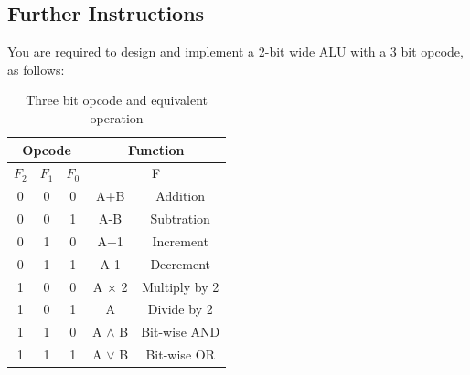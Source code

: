 \subsection{Further Instructions}
You are required to design and implement a 2-bit wide ALU with a 3 bit opcode, as follows:
\begin{table}[H]
\centering
\caption{Three bit opcode and equivalent operation}
\label{tbl:Opcodes}
\begin{tabular}{|c|c|c|c|c|}
\hline
\multicolumn{3}{|c|}{\textbf{Opcode}} & \multicolumn{2}{c|}{\textbf{Function}} \\ \hline
$F_2$ & $F_1$ & $F_0$ & \multicolumn{2}{c|}{F} \\ \hline
0 & 0 & 0 & A+B & Addition \\ \hline
0 & 0 & 1 & A-B & Subtration \\ \hline
0 & 1 & 0 & A+1 & Increment \\ \hline
0 & 1 & 1 & A-1 & Decrement \\ \hline
1 & 0 & 0 & A $\times$ 2 & Multiply by 2 \\ \hline
1 & 0 & 1 & A \textdiv 2 & Divide by 2 \\ \hline
1 & 1 & 0 & A $\wedge$ B & Bit-wise AND \\ \hline
1 & 1 & 1 & A $\vee$ B & Bit-wise OR \\ \hline
\end{tabular}%
\end{table}